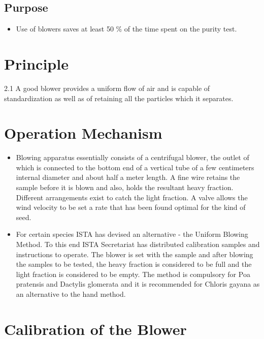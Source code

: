\documentclass[]{book}
\providecommand{\tightlist}{%
  \setlength{\itemsep}{0pt}\setlength{\parskip}{0pt}}
\begin{document}
\subsection{Purpose}\label{purpose}

\begin{itemize}
\tightlist
\item
  Use of blowers saves at least 50 \% of the time spent on the purity
  test.
\end{itemize}

\section{Principle}\label{principle}

2.1 A good blower provides a uniform flow of air and is capable of
standardization as well as of retaining all the particles which it
separates.

\section{Operation Mechanism}\label{operation-mechanism}

\begin{itemize}
\tightlist
\item
  Blowing apparatus essentially consists of a centrifugal blower, the
  outlet of which is connected to the bottom end of a vertical tube of a
  few centimeters internal diameter and about half a meter length. A
  fine wire retains the sample before it is blown and also, holds the
  resultant heavy fraction. Different arrangements exist to catch the
  light fraction. A valve allows the wind velocity to be set a rate that
  has been found optimal for the kind of seed.
\item
  For certain species ISTA has devised an alternative - the Uniform
  Blowing Method. To this end ISTA Secretariat has distributed
  calibration samples and instructions to operate. The blower is set
  with the sample and after blowing the samples to be tested, the heavy
  fraction is considered to be full and the light fraction is considered
  to be empty. The method is compulsory for Poa pratensis and Dactylis
  glomerata and it is recommended for Chloris gayana as an alternative
  to the hand method.
\end{itemize}

\section{Calibration of the Blower}\label{calibration-of-the-blower}
\end{document}
